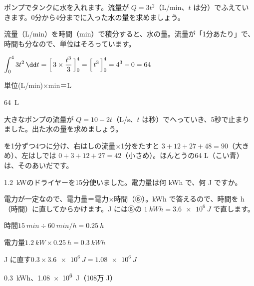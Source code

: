 \begin{reidai}[流量から水の量]
ポンプでタンクに水を入れます。流量が $Q=3t^2$（L/min、$t$ は分）でふえていきます。0分から4分までに入った水の量を求めましょう。\par
\kangaekata 流量（L/min）を時間（min）で積分すると、水の量。流量が「1分あたり」で、時間も分なので、単位はそろっています。\par
\shiki $\displaystyle\int_0^4 3t^2\,\dd t=\Bigl[\,3\times\frac{t^3}{3}\,\Bigr]_0^4=\Bigl[\,t^3\,\Bigr]_0^4=4^3-0=64$\par
\hspace*{2.6\zw}単位\quad (L/min)×min＝L\par
\kotae \qty{64}{L}
\end{reidai}

\begin{jibun}
大きなポンプの流量が $Q=10-2t$（L/s、$t$ は秒）でへっていき、5秒で止まりました。出た水の量を求めましょう。
\end{jibun}

\noindent\begin{minipage}[c]{0.46\linewidth}
\end{minipage}\hfill
\begin{minipage}[c]{0.52\linewidth}\raggedright
{}を1分ずつ4つに分け、右はしの流量×1分をたすと $3+12+27+48=90$（大きめ）、左はしでは $0+3+12+27=42$（小さめ）。ほんとうの64 L（こい青）は、そのあいだです。
\end{minipage}

\begin{reidai}[電力が一定のときの電力量]
\qty{1.2}{kW}のドライヤーを15分使いました。電力量は何 kWh で、何 J ですか。\par
\kangaekata 電力が一定なので、電力量＝電力×時間（⑥）。kWh で答えるので、時間を h（時間）に直してからかけます。J には⑥の $\qty{1}{kWh}=\qty{3.6e6}{J}$ で直します。\par
\shiki 時間\quad $\qty{15}{min}\div\qty{60}{min/h}=\qty{0.25}{h}$\par
\hspace*{2.6\zw}電力量\quad $\qty{1.2}{kW}\times\qty{0.25}{h}=\qty{0.3}{kWh}$\par
\hspace*{2.6\zw}J に直す\quad $0.3\times\qty{3.6e6}{J}=\qty{1.08e6}{J}$\par
\kotae \qty{0.3}{kWh}、\qty{1.08e6}{J}（108万 J）
\end{reidai}

